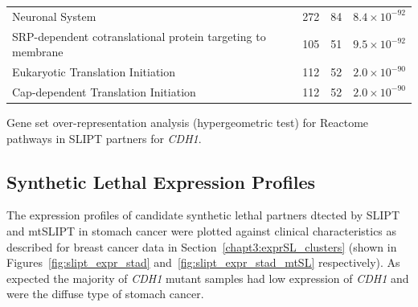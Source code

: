 \begin{table}[!ht]
{\begin{threeparttable}
\begin{tabular}{lccc}
  \rowcolor{black!10}
  Neuronal System & 272 &  84 & $8.4 \times 10^{-92}$ \\ 
  \rowcolor{black!5}
  SRP-dependent cotranslational protein targeting to membrane & 105 &  51 & $9.5 \times 10^{-92}$ \\ 
  \rowcolor{black!10}
  Eukaryotic Translation Initiation & 112 &  52 & $2.0 \times 10^{-90}$ \\ 
  \rowcolor{black!5}
  Cap-dependent Translation Initiation & 112 &  52 & $2.0 \times 10^{-90}$ \\ 
   \hline
\end{tabular}
\begin{tablenotes}
\raggedright \small
Gene set over-representation analysis (hypergeometric test) for Reactome pathways in \gls{SLIPT} partners for \textit{CDH1}.
\end{tablenotes}
\end{threeparttable}
}
\end{table}



\FloatBarrier

\subsection{Synthetic Lethal Expression Profiles} \label{chapt3:stad_SL_clusters}

The expression profiles of candidate synthetic lethal partners dtected by \gls{SLIPT} and mtSLIPT in stomach cancer were plotted against clinical characteristics as described for breast cancer data in Section~\ref{chapt3:exprSL_clusters} (shown in Figures~\ref{fig:slipt_expr_stad} and~\ref{fig:slipt_expr_stad_mtSL} respectively). As expected the majority of \textit{CDH1} mutant samples had low expression of \textit{CDH1} and were the diffuse type of stomach cancer.



